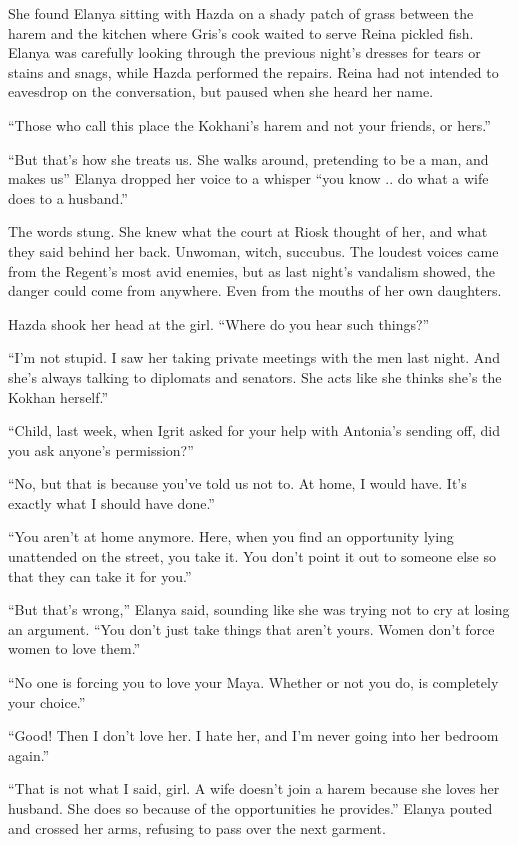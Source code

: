 \documentclass{article}
\begin{document}
	She found Elanya sitting with Hazda on a shady patch of grass between the harem and the kitchen where Gris’s cook waited to serve Reina pickled fish. Elanya was carefully looking through the previous night’s dresses for tears or stains and snags, while Hazda performed the repairs. Reina had not intended to eavesdrop on the conversation, but paused when she heard her name.
	
	“Those who call this place the Kokhani’s harem and not your friends, or hers.”
	
	“But that’s how she treats us. She walks around, pretending to be a man, and makes us” Elanya dropped her voice to a whisper “you know .. do what a wife does to a husband.” 
	
	The words stung. She knew what the court at Riosk thought of her, and what they said behind her back. Unwoman, witch, succubus. The loudest voices came from the Regent’s most avid enemies, but as last night’s vandalism showed, the danger could come from anywhere. Even from the mouths of her own daughters.
	
	Hazda shook her head at the girl. “Where do you hear such things?”
	
	“I’m not stupid. I saw her taking private meetings with the men last night. And she’s always talking to diplomats and senators. She acts like she thinks she’s the Kokhan herself.”
	
	“Child, last week, when Igrit asked for your help with Antonia’s sending off, did you ask anyone’s permission?”
	
	“No, but that is because you’ve told us not to. At home, I would have. It’s exactly what I should have done.” 
	
	“You aren’t at home anymore. Here, when you find an opportunity lying unattended on the street, you take it. You don’t point it out to someone else so that they can take it for you.”
	
	“But that's wrong,” Elanya said, sounding like she was trying not to cry at losing an argument. “You don’t just take things that aren’t yours. Women don’t force women to love them.” 
	
	“No one is forcing you to love your Maya. Whether or not you do, is completely your choice.”
	
	“Good! Then I don’t love her. I hate her, and I’m never going into her bedroom again.”
	
	
	“That is not what I said, girl. A wife doesn’t join a harem because she loves her husband. She does so because of the opportunities he provides.” Elanya pouted and crossed her arms, refusing to pass over the next garment.
	
\end{document}

